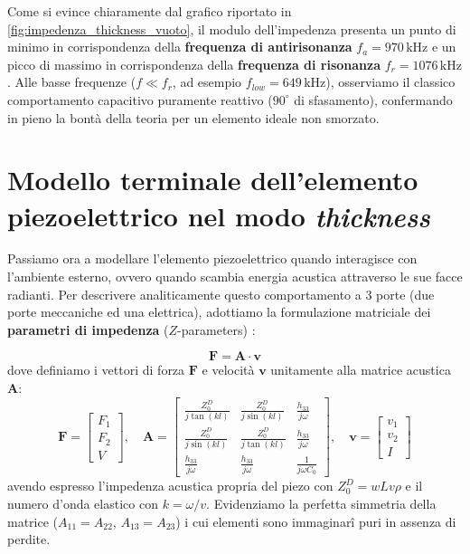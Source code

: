 Come si evince chiaramente dal grafico riportato in \cref{fig:impedenza_thickness_vuoto}, il modulo dell'impedenza presenta un punto di minimo in corrispondenza della \textbf{frequenza di antirisonanza} $f_a = 970\,\text{kHz}$ e un picco di massimo in corrispondenza della \textbf{frequenza di risonanza} $f_r = 1076\,\text{kHz}$. Alle basse frequenze ($f \ll f_r$, ad esempio $f_{low} = 649\,\text{kHz}$), osserviamo il classico comportamento capacitivo puramente reattivo ($90^\circ$ di sfasamento), confermando in pieno la bontà della teoria per un elemento ideale non smorzato.

\section{Modello terminale dell'elemento piezoelettrico nel modo \textit{thickness}}
\label{sec:modello_terminale}

Passiamo ora a modellare l'elemento piezoelettrico quando interagisce con l'ambiente esterno, ovvero quando scambia energia acustica attraverso le sue facce radianti. Per descrivere analiticamente questo comportamento a 3 porte (due porte meccaniche ed una elettrica), adottiamo la formulazione matriciale dei \textbf{parametri di impedenza} ($Z$-parameters) \cite{impedance_parameters}:

\begin{equation}
    \boldsymbol{F} = \boldsymbol{A} \cdot \boldsymbol{v}
    \label{eq:sistema_A}
\end{equation}
dove definiamo i vettori di forza $\boldsymbol{F}$ e velocità $\boldsymbol{v}$ unitamente alla matrice acustica $\boldsymbol{A}$:
\begin{equation}
    \boldsymbol{F} = \begin{bmatrix} F_1 \\ F_2 \\ V \end{bmatrix}, \quad
    \boldsymbol{A} = \begin{bmatrix}
        \frac{Z_0^D}{j\tan(kl)} & \frac{Z_0^D}{j\sin(kl)} & \frac{h_{33}}{j\omega} \\
        \frac{Z_0^D}{j\sin(kl)} & \frac{Z_0^D}{j\tan(kl)} & \frac{h_{33}}{j\omega} \\
        \frac{h_{33}}{j\omega} & \frac{h_{33}}{j\omega} & \frac{1}{j\omega C_0}
    \end{bmatrix}, \quad
    \boldsymbol{v} = \begin{bmatrix} v_1 \\ v_2 \\ I \end{bmatrix}
    \label{eq:matrice_A}
\end{equation}
avendo espresso l'impedenza acustica propria del piezo con $Z_0^D = w L v \rho$ e il numero d'onda elastico con $k = \omega/v$. Evidenziamo la perfetta simmetria della matrice ($A_{11}=A_{22}$, $A_{13}=A_{23}$) i cui elementi sono immaginarî puri in assenza di perdite.

